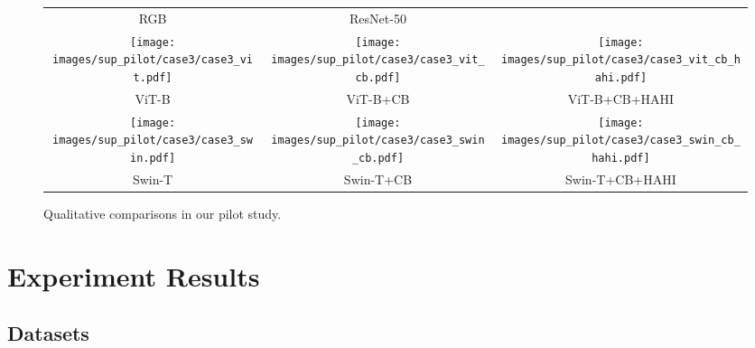 \documentclass[twocolumn]{svjour3}    \pdfoutput=1
\begin{document}
\begin{figure*}[t]
\begin{tabular}{ccc}
        \\
        RGB&ResNet-50
        \\
        \texttt{[image: images/sup\_pilot/case3/case3\_vit.pdf]}&
        \texttt{[image: images/sup\_pilot/case3/case3\_vit\_cb.pdf]}&
        \texttt{[image: images/sup\_pilot/case3/case3\_vit\_cb\_hahi.pdf]}
        \\
        ViT-B&ViT-B+CB&ViT-B+CB+HAHI
        \\
        \texttt{[image: images/sup\_pilot/case3/case3\_swin.pdf]}&
        \texttt{[image: images/sup\_pilot/case3/case3\_swin\_cb.pdf]}&
        \texttt{[image: images/sup\_pilot/case3/case3\_swin\_cb\_hahi.pdf]}
        \\
        Swin-T&Swin-T+CB&Swin-T+CB+HAHI
        \\
    \end{tabular}
    \caption{Qualitative comparisons in our pilot study.}
    \label{fig:sup-qualitative-comparison-pilot}
 \end{figure*}

\section{Experiment Results}
\label{sec:experiments}
\subsection{Datasets}
\end{document}
